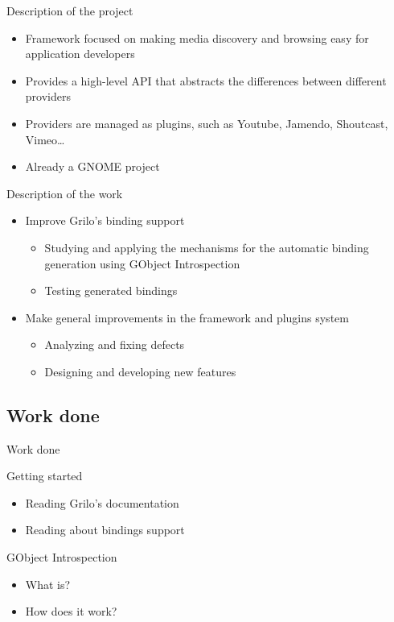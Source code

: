 \documentclass{beamer}
\begin{document}
\begin{frame}{Description of the project}
\begin{itemize}
  \item Framework focused on making media discovery and browsing easy for application developers
  \item Provides a high-level API that abstracts the differences between different providers
  \item Providers are managed as plugins, such as Youtube, Jamendo, Shoutcast, Vimeo\dots
  \item Already a GNOME project
\end{itemize}
\end{frame}

\begin{frame}{Description of the work}
\begin{itemize}
  \item Improve Grilo’s binding support
  \begin{itemize}
    \item Studying and applying the mechanisms for the automatic binding generation using GObject Introspection
    \item Testing generated bindings
  \end{itemize}
  \item Make general improvements in the framework and plugins system
  \begin{itemize}
    \item Analyzing and fixing defects
    \item Designing and developing new features
  \end{itemize}
\end{itemize}
\end{frame}

\subsection{Work done}

\begin{frame}{Work done}
\begin{block}{Getting started}
\begin{itemize}
  \item Reading Grilo's documentation
  \item Reading about bindings support
\end{itemize}
\end{block}
\begin{block}{GObject Introspection}
  \begin{itemize}
    \item What is?
    \item<3-> How does it work?
  \end{itemize}
\end{block}
\end{frame}
\end{document}
